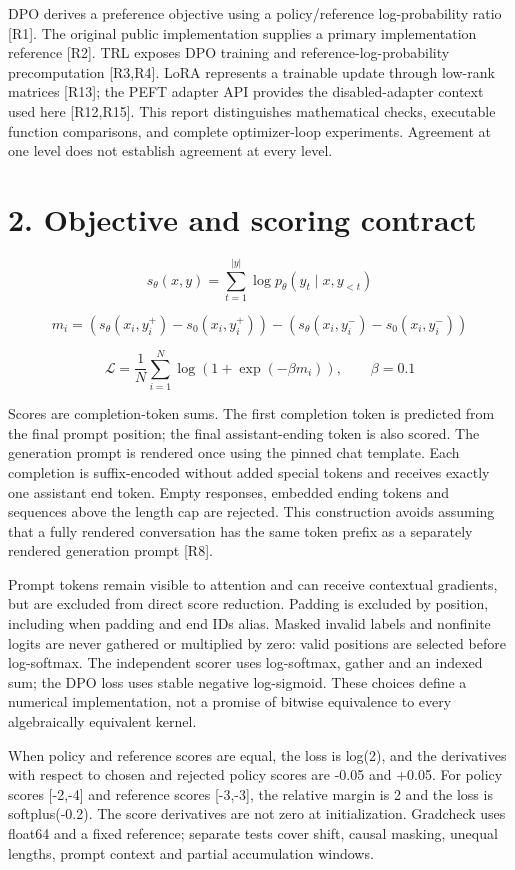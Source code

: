 \documentclass[10pt]{article}
\begin{document}
DPO derives a preference objective using a policy/reference log-probability ratio [R1]. The original public implementation supplies a primary implementation reference [R2]. TRL exposes DPO training and reference-log-probability precomputation [R3,R4]. LoRA represents a trainable update through low-rank matrices [R13]; the PEFT adapter API provides the disabled-adapter context used here [R12,R15]. This report distinguishes mathematical checks, executable function comparisons, and complete optimizer-loop experiments. Agreement at one level does not establish agreement at every level.


\section*{2. Objective and scoring contract}

\[
s_\theta(x,y)=\sum_{t=1}^{|y|}\log p_\theta(y_t\mid x,y_{<t})
\]

\[
m_i=(s_\theta(x_i,y_i^+)-s_0(x_i,y_i^+))-(s_\theta(x_i,y_i^-)-s_0(x_i,y_i^-))
\]

\[
\mathcal{L}=\frac{1}{N}\sum_{i=1}^{N}\log(1+\exp(-\beta m_i)),\qquad\beta=0.1
\]

Scores are completion-token sums. The first completion token is predicted from the final prompt position; the final assistant-ending token is also scored. The generation prompt is rendered once using the pinned chat template. Each completion is suffix-encoded without added special tokens and receives exactly one assistant end token. Empty responses, embedded ending tokens and sequences above the length cap are rejected. This construction avoids assuming that a fully rendered conversation has the same token prefix as a separately rendered generation prompt [R8].


Prompt tokens remain visible to attention and can receive contextual gradients, but are excluded from direct score reduction. Padding is excluded by position, including when padding and end IDs alias. Masked invalid labels and nonfinite logits are never gathered or multiplied by zero: valid positions are selected before log-softmax. The independent scorer uses log-softmax, gather and an indexed sum; the DPO loss uses stable negative log-sigmoid. These choices define a numerical implementation, not a promise of bitwise equivalence to every algebraically equivalent kernel.


When policy and reference scores are equal, the loss is log(2), and the derivatives with respect to chosen and rejected policy scores are -0.05 and +0.05. For policy scores [-2,-4] and reference scores [-3,-3], the relative margin is 2 and the loss is softplus(-0.2). The score derivatives are not zero at initialization. Gradcheck uses float64 and a fixed reference; separate tests cover shift, causal masking, unequal lengths, prompt context and partial accumulation windows.
\end{document}
